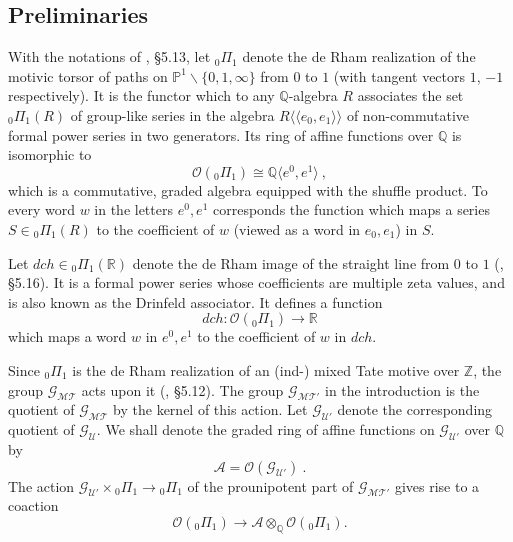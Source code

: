 \documentclass[10pt]{amsart}
\theoremstyle{definition}
\theoremstyle{remark}
\numberwithin{equation}{section}
\newcommand{\Z}{\mathbb Z}
\newcommand{\R}{\mathbb R}
\newcommand{\Pro}{\mathbb P}
\newcommand{\GMT}{\mathcal{G_{MT}}}
\newcommand{\GU}{\mathcal{G}_{\mathcal{U}}}
\newcommand{\GP}{\mathcal{G_{MT'}}}
\newcommand{\GPU}{\mathcal{G_{\mathcal{U'}}}}
\newcommand{\Ao}{\mathcal{A}}
\newcommand{\pio}{{}_0 \Pi_{1}}
\newcommand{\dch}{dch}
\newcommand{\Q}{\mathbb Q}
\newcommand{\To}{\longrightarrow}
\begin{document}
\subsection{Preliminaries} \label{sectprelim}
With  the notations of \cite{DG}, \S5.13, let 
$\pio$ 
denote the de Rham realization of the motivic torsor of paths on $\Pro^1\backslash \{0,1,\infty\}$ from $0$ to $1$ (with tangent vectors $1$, $-1$ respectively).
It is the functor which to any $\Q$-algebra $R$ associates the 
 set $\pio(R)$ of group-like series in  the algebra $R\langle \langle e_0,e_1\rangle\rangle$ of non-commutative formal
power series in two generators. Its ring of affine functions over $\Q$ is isomorphic to 
\begin{equation}\label{opi01} \mathcal{O}(\pio) \cong \Q \langle e^0, e^1 \rangle\ ,
\end{equation} 
which is a commutative, graded algebra equipped with the shuffle product. To every word $w$ in the letters  $e^0,e^1$ corresponds the function 
which maps a series $S \in \pio(R) $ to the coefficient of $w$ (viewed as a word in $e_0,e_1$) in $S$.

Let $\dch\in \pio(\R)$ denote the de Rham image of the straight line from $0$ to $1$ (\cite{DG}, \S5.16).  
 It is a formal power series whose  coefficients are multiple zeta values, and is   also known as the Drinfeld associator.  It defines a function 
 \begin{equation}\label{dchdual}
 \dch : \mathcal{O}(\pio)\To \R
  \end{equation}
which maps a word $w$  in $e^0, e^1$ to the coefficient of $w$ in $dch$. 

Since $\pio$ is the de Rham realization of an (ind-)  mixed Tate motive over $\Z$, the group $\GMT$ acts upon it (\cite{DG}, \S5.12). The group $\GP$  in the introduction is the 
quotient of $\GMT$ by the kernel of this action.    Let $\GPU$ denote the corresponding quotient of $\GU$.
We shall denote the graded ring of affine functions on  $\GPU$ over $\Q$ by
$$\Ao=\mathcal{O}(\GPU)\ .$$
   The action $\GPU\times \pio \rightarrow \pio$ of the prounipotent part of $\GP$  gives rise to a coaction
  \begin{equation} \label{Ocoaction}
  \mathcal{O}(\pio)\To \Ao \otimes_{\Q} \mathcal{O}(\pio) . 
  \end{equation}
  
\end{document}
